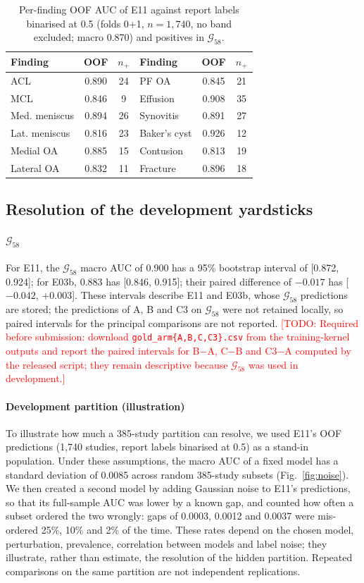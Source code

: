 \documentclass{ieeeaccess}
\newcommand{\TODO}[1]{\textcolor{red}{[TODO: #1]}}
\newcommand{\gold}{$\mathcal{G}_{58}$}
\begin{document}
\begin{table}[!t]
\centering
\caption{Per-finding OOF AUC of E11 against report labels binarised at 0.5 (folds 0+1, $n=1{,}740$, no band excluded;
macro 0.870) and positives in \gold.}
\label{tab:perfind}
\footnotesize
\setlength{\tabcolsep}{3pt}
\begin{tabular}{lcc@{\hskip 8pt}lcc}
\toprule
Finding & OOF & $n_+$ & Finding & OOF & $n_+$\\
\midrule
ACL & 0.890 & 24 & PF OA & 0.845 & 21\\
MCL & 0.846 & 9 & Effusion & 0.908 & 35\\
Med. meniscus & 0.894 & 26 & Synovitis & 0.891 & 27\\
Lat. meniscus & 0.816 & 23 & Baker's cyst & 0.926 & 12\\
Medial OA & 0.885 & 15 & Contusion & 0.813 & 19\\
Lateral OA & 0.832 & 11 & Fracture & 0.896 & 18\\
\bottomrule
\end{tabular}
\end{table}

\subsection{Resolution of the development yardsticks}
\label{sec:res-yard}
\paragraph*{\gold} For E11, the \gold{} macro AUC of 0.900 has a 95\% bootstrap interval of [0.872, 0.924]; for E03b,
0.883 has [0.846, 0.915]; their paired difference of $-0.017$ has [$-0.042$, $+0.003$]. These intervals describe E11 and
E03b, whose \gold{} predictions are stored; the predictions of A, B and C3 on \gold{} were not retained locally, so paired
intervals for the principal comparisons are not reported. \TODO{Required before submission: download
\texttt{gold\_arm\{A,B,C,C3\}.csv} from the training-kernel outputs and report the paired intervals for B$-$A, C$-$B and
C3$-$A computed by the released script; they remain descriptive because \gold{} was used in development.}

\paragraph*{Development partition (illustration)} To illustrate how much a 385-study partition can resolve, we used
E11's OOF predictions (1,740 studies, report labels binarised at 0.5) as a stand-in population. Under these assumptions,
the macro AUC of a fixed model has a standard deviation of 0.0085 across random 385-study subsets (Fig.~\ref{fig:noise}).
We then created a second model by adding Gaussian noise to E11's predictions, so that its full-sample AUC was lower by a
known gap, and counted how often a subset ordered the two wrongly: gaps of 0.0003, 0.0012 and 0.0037 were mis-ordered 25\%,
10\% and 2\% of the time. These rates depend on the chosen model, perturbation, prevalence, correlation between models and
label noise; they illustrate, rather than estimate, the resolution of the hidden partition. Repeated comparisons on the
same partition are not independent replications.
\end{document}
